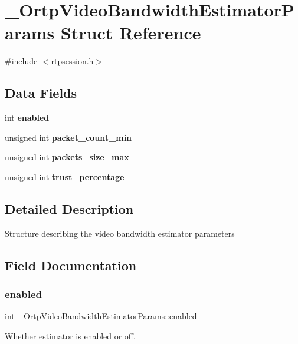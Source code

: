 \section{\+\_\+\+Ortp\+Video\+Bandwidth\+Estimator\+Params Struct Reference}
\label{struct__OrtpVideoBandwidthEstimatorParams}


{\ttfamily \#include $<$rtpsession.\+h$>$}

\subsection*{Data Fields}
\begin{DoxyCompactItemize}
\item 
int \textbf{ enabled}
\item 
\mbox{\label{struct__OrtpVideoBandwidthEstimatorParams_a0ce1cb5c2c03abf5e213bacf2469bbc3}} 
unsigned int {\bfseries packet\+\_\+count\+\_\+min}
\item 
unsigned int \textbf{ packets\+\_\+size\+\_\+max}
\item 
unsigned int \textbf{ trust\+\_\+percentage}
\end{DoxyCompactItemize}


\subsection{Detailed Description}
Structure describing the video bandwidth estimator parameters 

\subsection{Field Documentation}
\mbox{\label{struct__OrtpVideoBandwidthEstimatorParams_adcf2c3227059d43f44ccd5bc0052cc97}} 
\subsubsection{enabled}
{\footnotesize\ttfamily int \+\_\+\+Ortp\+Video\+Bandwidth\+Estimator\+Params\+::enabled}

Whether estimator is enabled or off. \mbox{\label{struct__OrtpVideoBandwidthEstimatorParams_af0bf9b6423061166ac079a5c7020336f}} 
